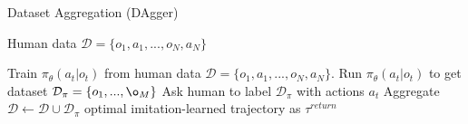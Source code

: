 \begin{algorithm}[t!]
\caption{Dataset Aggregation (DAgger)}
\begin{algorithmic}[1]
\label{alg:dagger}
\REQUIRE Human data $\mathcal{D} = \{o_1,a_1,...,o_N,a_N\}$

    \STATE Train $\pi_\theta(a_t|o_t)$ from human data $\mathcal{D} = \{o_1,a_1,...,o_N,a_N\}$.
    \STATE Run $\pi_\theta(a_t|o_t)$ to get dataset $\mathcal{D}_\pi = \{o_1,...,\o_M\}$
    \STATE Ask human to label $\mathcal{D}_\pi$ with actions $a_t$
    \STATE Aggregate $\mathcal{D} \leftarrow \mathcal{D} \cup \mathcal{D_\pi}$
\ENDWHILE
\RETURN optimal imitation-learned trajectory as $\tau^{return}$
\end{algorithmic}
\end{algorithm}